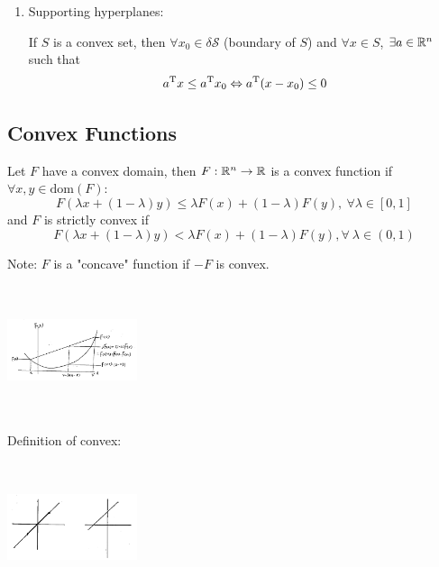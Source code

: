 \begin{enumerate}
	\item Supporting hyperplanes:


	If $S$ is a convex set, then $\forall x_0\in \delta \mathcal{S}$ (boundary of $S$) and $\forall x\in S$, $\exists a\in \mathbb{R}^n$ such that 
	$$a^{{\rm T}}x \leq a^{{\rm T}}x_0\Leftrightarrow a^{{\rm T}}(x - x_0)\leq 0$$

	
\end{enumerate}

\subsection{Convex Functions}
Let $F$ have a convex domain, then $F:\mathbb{R}^n\rightarrow \mathbb{R}$ is a convex function if $\forall x,y \in \text{dom} (F)$:
\begin{equation*}
F(\lambda x + (1-\lambda)y) \leq \lambda F(x) + (1-\lambda)F(y),\ \forall \lambda \in [0,1]
\end{equation*}
and $F$ is strictly convex if 
\begin{equation*}
F(\lambda x + (1-\lambda)y) < \lambda F(x) + (1-\lambda)F(y), \forall\ \lambda \in (0,1)
\end{equation*}

Note: $F$ is a "concave" function if $-F$ is convex.

\begin{marginfigure}
	\centering
	\includegraphics[width=1.5in,height=1.5in]{figures/ch08/figure1030_6.png}
\end{marginfigure}

Definition of convex:
	
\begin{marginfigure}
	\centering
	\includegraphics[width=1.5in,height=1.5in]{figures/ch08/figure1030_7.png}
\end{marginfigure}

